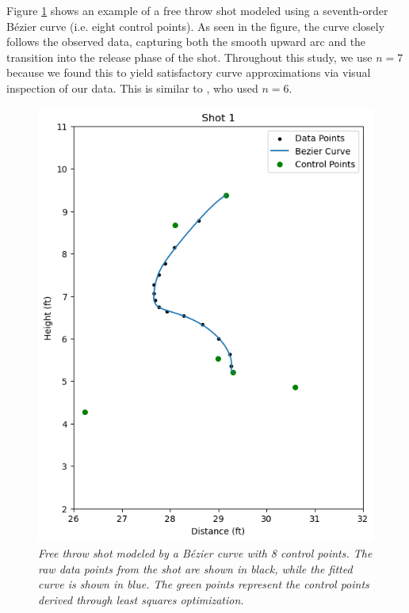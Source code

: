 \documentclass{article}
\begin{document}
            Figure \ref{fig:free-throw-bezier} shows an example of a free throw shot modeled using a seventh-order Bézier curve (i.e. eight control points). As seen in the figure, the curve closely follows the observed data, capturing both the smooth upward arc and the transition into the release phase of the shot. Throughout this study, we use $n = 7$ because we found this to yield satisfactory curve approximations via visual inspection of our data. This is similar to \citet{slegers_role_2024}, who used $n = 6$.
            
            \begin{figure}
                \centering
                \includegraphics[scale=0.4]{shot1.png}
                \caption{\it Free throw shot modeled by a Bézier curve with 8 control points. The raw data points from the shot are shown in black, while the fitted curve is shown in blue. The green points represent the control points derived through least squares optimization.}
                \label{fig:free-throw-bezier}
            \end{figure}
\end{document}
